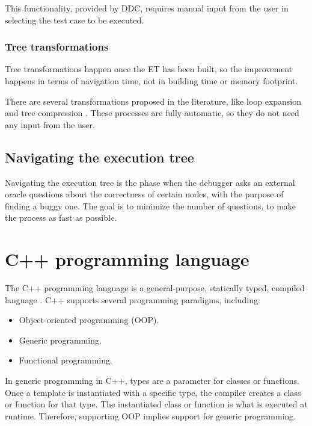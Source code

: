 This functionality, provided by DDC, requires manual input from the user in selecting the test case to be executed.


\subsubsection{Tree transformations}
Tree transformations happen once the ET has been built, so the improvement happens in terms of navigation time, not in building time or memory footprint.

There are several transformations proposed in the literature, like loop expansion and tree compression \cite{LoopExpansionTreeCompression}.
These processes are fully automatic, so they do not need any input from the user.

\subsection{Navigating the execution tree}
Navigating the execution tree is the phase when the debugger asks an external oracle questions about the correctness of certain nodes, with the purpose of finding a buggy one.
The goal is to minimize the number of questions, to make the process as fast as possible.
\section{C++ programming language}
The C++ programming language is a general-purpose, statically typed, compiled language \cite{cppHistory}.
%
C++ supports several programming paradigms, including:

\begin{itemize}
    \item Object-oriented programming (OOP).
    \item Generic programming.
    \item Functional programming.
\end{itemize}

In generic programming in C++, types are a parameter for classes or functions.
Once a template is instantiated with a specific type, the compiler creates a class or function for that type.
The instantiated class or function is what is executed at runtime. Therefore, supporting OOP implies support for generic programming.


